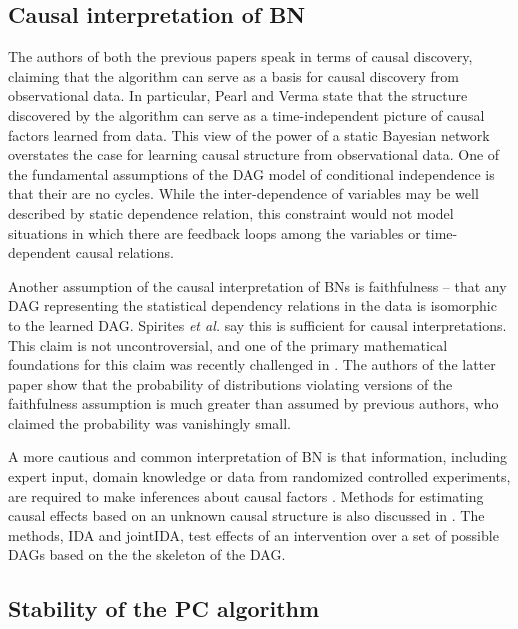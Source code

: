     \subsection{Causal interpretation of BN}

    The authors of both the previous papers speak in terms of
    causal discovery, claiming that the algorithm can serve
    as a basis for causal discovery from observational
    data. In particular, Pearl and Verma state that 
    the structure discovered by the algorithm
    can serve as a time-independent picture of causal factors
    learned from data. 
    This view of the power of a static Bayesian network 
    overstates the case for learning causal structure from 
    observational data. One of the 
    fundamental assumptions of the DAG model of conditional 
    independence is that their are no cycles. 
    While the inter-dependence of variables may be well described by 
    static dependence relation, this constraint would 
    not model situations in which there are feedback loops
    among the variables or time-dependent causal 
    relations.  

    Another assumption of the causal interpretation of BNs is 
    faithfulness -- that any DAG representing the
    statistical dependency relations in the data is isomorphic
    to the learned DAG. Spirites  \textit{et al.} say this is 
    sufficient for causal interpretations. This claim is not 
    uncontroversial,
    and one of the primary mathematical foundations for this
    claim was recently challenged in \cite{Uhler}. The authors
    of the latter paper show that the probability of distributions violating
    versions of the faithfulness assumption is much
    greater than assumed by previous authors, who claimed
    the probability was vanishingly small.  

    A more cautious and common interpretation of BN is
    that information, including expert input, domain 
    knowledge or data from randomized controlled experiments,
     are required to make inferences about
    causal factors \cite{Maathuis2015}\cite{Freedman2010}. Methods for estimating causal effects based on an unknown causal 
     structure is also discussed in \cite{Maathuis2015}. The methods, 
     IDA and jointIDA, test effects of an intervention over a set
     of possible DAGs based on the the skeleton of the DAG. 


    \subsection{Stability of the PC algorithm }
  
